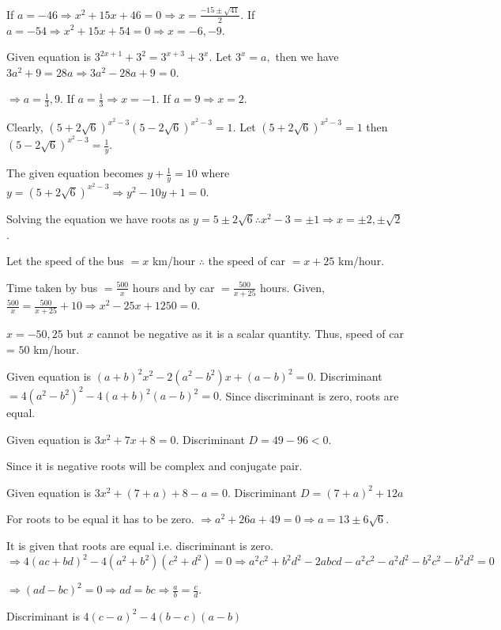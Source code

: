   If $a = -46 \Rightarrow x^2 + 15x + 46 = 0 \Rightarrow x = \frac{-15 \pm \sqrt{41}}{2}$. If $a = -54
  \Rightarrow x^2 + 15x + 54 = 0 \Rightarrow x = - 6, -9$.
\item Given equation is $3^{2x + 1} + 3^2 = 3^{x + 3} + 3^x$. Let $3^x = a,$ then we have $3a^2 + 9 = 28a
  \Rightarrow 3a^2 - 28a + 9 = 0$.

  $\Rightarrow a = \frac{1}{3}, 9$. If $a = \frac{1}{3} \Rightarrow x = -1$. If $a = 9 \Rightarrow x = 2$.
\item Clearly, $(5 + 2\sqrt{6})^{x^2 - 3}(5 - 2\sqrt{6})^{x^2 - 3} = 1$. Let $(5 + 2\sqrt{6})^{x^2 - 3} = 1$
  then $(5 - 2\sqrt{6})^{x^2 - 3} = \frac{1}{y}$.

  The given equation becomes $y + \frac{1}{y} = 10$ where $y = (5 + 2\sqrt{6})^{x^2 - 3}\Rightarrow y^2 -10y
  + 1 = 0$.

  Solving the equation we have roots as $y = 5 \pm 2\sqrt{6}\therefore x^2 - 3 = \pm 1\Rightarrow x = \pm2,
  \pm\sqrt{2}$.
\item Let the speed of the bus $= x$ km/hour $\therefore$ the speed of car $= x + 25$ km/hour.

  Time taken by bus $= \frac{500}{x}$ hours and by car $= \frac{500}{x + 25}$ hours. Given, $\frac{500}{x} =
  \frac{500}{x + 25} + 10\Rightarrow x^2 - 25x + 1250 = 0$.

  $x = -50, 25$ but $x$ cannot be negative as it is a scalar quantity. Thus, speed of car = $50$ km/hour.
\item Given equation is $(a + b)^2x^2 - 2(a^2 - b^2)x + (a - b)^2 = 0$. Discriminant $= 4(a^2 - b^2)^2 - 4(a
  + b)^2(a - b)^2 = 0$. Since discriminant is zero, roots are equal.
\item Given equation is $3x^2 + 7x + 8 = 0$. Discriminant $D = 49 - 96 < 0$.

  Since it is negative roots will be complex and conjugate pair.
\item Given equation is $3x^2 + (7 + a) + 8 - a = 0$. Discriminant $D = (7 + a)^2 + 12a$

  For roots to be equal it has to be zero. $\Rightarrow a^2 + 26a + 49 = 0\Rightarrow a = 13 \pm
  6\sqrt{6}$.
\item It is given that roots are equal i.e. discriminant is zero. $\Rightarrow 4(ac + bd)^2 - 4(a^2 +
  b^2)(c^2 + d^2) = 0\Rightarrow a^2c^2 + b^2d^2 - 2abcd - a^2c^2 - a^2d^2 - b^2c^2 - b^2d^2 = 0$

  $\Rightarrow (ad - bc)^2 = 0\Rightarrow ad = bc \Rightarrow \frac{a}{b} = \frac{c}{d}$.
\item Discriminant is $4(c - a)^2 - 4(b - c)(a - b)$

